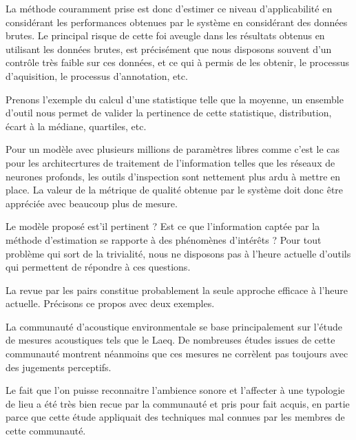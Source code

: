 La méthode couramment prise est donc d'estimer ce niveau d'applicabilité
en considérant les performances obtenues par le système en considérant des données brutes. Le principal risque de cette foi aveugle dans les résultats obtenus en utilisant les données brutes, est précisément que nous disposons souvent d'un contrôle très faible sur ces données, et ce qui à permis de les obtenir,  le processus d'aquisition, le processus d'annotation, etc.

Prenons l'exemple du calcul d'une statistique telle que la moyenne, un ensemble d'outil nous permet de valider la pertinence de cette statistique, distribution, écart à la médiane, quartiles, etc.

Pour un modèle avec plusieurs millions de paramètres libres comme c'est le cas pour les architecrtures de traitement de l'information telles que les réseaux de neurones profonds, les outils d'inspection sont nettement plus ardu à mettre en place. La valeur de la métrique de qualité obtenue par le système doit donc être appréciée avec beaucoup plus de mesure.

Le modèle proposé est'il pertinent ? Est ce que l'information captée par la méthode d'estimation se rapporte à des phénomènes d'intérêts ? Pour tout problème qui sort de la trivialité, nous ne disposons pas à l'heure actuelle d'outils qui permettent de répondre à ces questions.

La revue par les pairs constitue probablement la seule approche efficace à l'heure actuelle. Précisons ce propos avec deux exemples.

La communauté d'acoustique environmentale se base principalement sur l'étude de mesures acoustiques tels que le Laeq. De nombreuses études issues de cette communauté montrent néanmoins que ces mesures ne corrèlent pas toujours avec des jugements perceptifs.

Le fait que l'on puisse reconnaitre l'ambience sonore et l'affecter à une typologie de lieu a été très bien recue par la communauté et pris pour fait acquis, en partie parce que cette étude appliquait des techniques mal connues par les membres de cette communauté.

